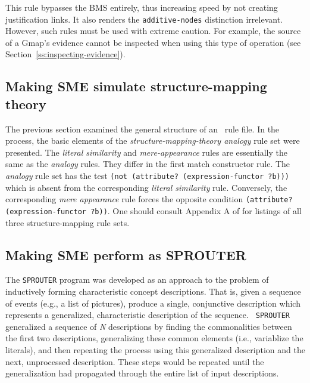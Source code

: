 This rule bypasses the BMS entirely, thus increasing speed by not creating
justification links. It also renders the {\tt additive-nodes} distinction
irrelevant. However, such rules must be used with extreme caution.  For
example, the source of a Gmap's evidence cannot be inspected when using this
type of operation (see Section~\ref{ss:inspecting-evidence}).

\subsection{Making SME simulate structure-mapping theory}

The previous section examined the general structure of an \SME\ rule file.
In the process, the basic elements of the {\it structure-mapping-theory
analogy} rule set were presented. The {\it literal similarity} and
{\it mere-appearance} rules are essentially the same as the {\it analogy}
rules. They differ in the first match constructor rule. The {\it analogy}
rule set has the test {\tt (not (attribute? (expression-functor ?b)))} which is
absent from the corresponding {\it literal similarity} rule. Conversely, the
corresponding {\it mere appearance} rule forces the opposite condition
{\tt (attribute? (expression-functor ?b))}. One should consult Appendix A of
\cite{sme-aij} for listings of all three structure-mapping rule sets.

\subsection{Making SME perform as SPROUTER}

The {\tt SPROUTER} program \cite{hayes-roth} was
developed as an approach to the problem of inductively forming
characteristic concept descriptions. That is, given a sequence of events
(e.g., a list of pictures), produce a single, conjunctive description which
represents a generalized, characteristic description of the sequence. {\tt
SPROUTER} generalized a sequence of {\it N} descriptions by finding the
commonalities between the first two descriptions, generalizing these common
elements (i.e., variablize the literals), and then repeating the process
using this generalized description and the next, unprocessed description.
These steps would be repeated until the generalization had propagated
through the entire list of input descriptions.

